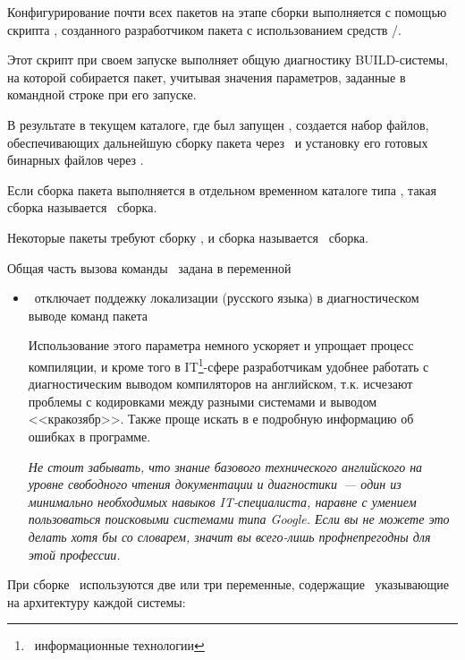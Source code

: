 
Конфигурирование почти всех пакетов на этапе сборки выполняется с помощью
скрипта , созданного разработчиком пакета с
использованием средств /.

Этот скрипт при своем запуске выполняет общую диагностику BUILD-системы, на
которой собирается пакет, учитывая значения параметров, заданные в командной
строке при его запуске.

В результате в текущем каталоге, где был запущен , создается
набор файлов, обеспечивающих дальнейшую сборку пакета через \ и
установку его готовых бинарных файлов через .

Если сборка пакета выполняется в отдельном временном каталоге типа
, такая сборка называется \ сборка.

Некоторые пакеты требуют сборку 
, и сборка называется \ сборка.

Общая часть вызова команды \ задана в переменной 



\begin{itemize}
  \item {}\ отключает поддежку локализации (русского языка) в
  диагностическом выводе команд пакета
  
  Использование этого параметра немного ускоряет и упрощает процесс компиляции,
  и кроме того в IT\footnote{\ информационные технологии}-сфере разработчикам
  удобнее работать с диагностическим выводом компиляторов на английском, т.к.
  исчезают проблемы с кодировками между разными системами и выводом
  <<кракозябр>>. Также проще искать в \internet е подробную информацию об
  ошибках в программе.
  
  \emph{Не стоит забывать, что знание базового технического английского на
  уровне свободного чтения документации и диагностики\ --- один из минимально
  необходимых навыков IT-специалиста, наравне с умением пользоваться поисковыми
  системами типа Google. Если вы не можете это делать хотя бы со словарем,
  значит вы всего-лишь профнепрегодны для этой профессии.}
\end{itemize}

При сборке \ используются две или три переменные,
содержащие \ указывающие на архитектуру каждой системы:

